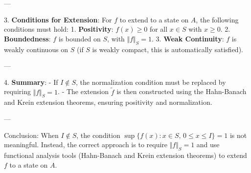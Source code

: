 \documentclass{article}
\begin{document}
---

3. \textbf{Conditions for Extension}: For $f$ to extend to a state on $A$,
the following conditions must hold: 1. \textbf{Positivity}: $f(x)\geq 0$ for
all $x\in S$ with $x\geq 0$. 2. \textbf{Boundedness}: $f$ is bounded on $S$,
with $\Vert f\Vert _{S}=1$. 3. \textbf{Weak Continuity}: $f$ is weakly
continuous on $S$ (if $S$ is weakly compact, this is automatically
satisfied).

---

4. \textbf{Summary}: - If $I\notin S$, the normalization condition must be
replaced by requiring $\Vert f\Vert _{S}=1$. - The extension $\tilde{f}$ is
then constructed using the Hahn-Banach and Krein extension theorems,
ensuring positivity and normalization.

---

Conclusion: When $I\notin S$, the condition $\sup \{f(x):x\in S,\,0\leq
x\leq I\}=1$ is not meaningful. Instead, the correct approach is to require $%
\Vert f\Vert _{S}=1$ and use functional analysis tools (Hahn-Banach and
Krein extension theorems) to extend $f$ to a state on $A$.
\end{document}
